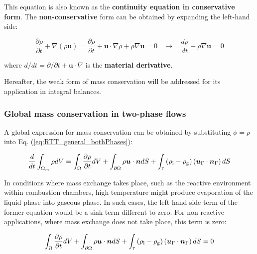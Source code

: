 This equation is also known as the \textbf{continuity equation in conservative form}. The \textbf{non-conservative} form can be obtained by expanding the left-hand side:

\begin{equation}
\frac{\partial \rho}{\partial t} + \nabla \left( \rho \boldsymbol{u} \right) = \frac{\partial \rho}{\partial t} + \boldsymbol{u} \cdot \nabla \rho  + \rho \nabla \boldsymbol{u} = 0 ~~~~ \rightarrow ~~~~ \frac{d \rho}{d t} + \rho \nabla \boldsymbol{u} = 0
\end{equation}

where $d / d t = \partial / \partial t + \boldsymbol{u} \cdot \nabla $ is the \textbf{material derivative}. 

Hereafter, the weak form of mass conservation will be addressed for its application in integral balances.

\subsubsection*{Global mass conservation in two-phase flows}

A global expression for mass conservation can be obtained by substituting $\phi = \rho$ into Eq. (\ref{eq:RTT_general_bothPhases}):

\begin{equation}
\frac{d}{dt} \int_{\Omega_m} \rho dV =   \int_{\Omega}  \frac{\partial \rho}{\partial t}  dV + \int_{\partial \Omega} \rho \boldsymbol{u} \cdot \boldsymbol{n} dS + \int_\mathsmaller{\Gamma} \left( \rho_\mathrm{l} - \rho_\mathrm{g} \right) \left( \boldsymbol{u}_{\scriptsize{\Gamma}} \cdot \boldsymbol{n}_{\scriptsize{\Gamma}} \right) dS
\end{equation}

In conditions where mass exchange takes place, such as the reactive environment within combustion chambers, high temperature might produce evaporation of the liquid phase into gaseous phase. In such cases, the left hand side term of the former equation would be a sink term different to zero. For non-reactive applications, where mass exchange does not take place, this term is zero:

\begin{equation}
\int_{\Omega}  \frac{\partial \rho}{\partial t}  dV + \int_{\partial \Omega} \rho \boldsymbol{u} \cdot \boldsymbol{n} dS + \int_\mathsmaller{\Gamma} \left( \rho_\mathrm{l} - \rho_\mathrm{g} \right) \left( \boldsymbol{u}_{\scriptsize{\Gamma}} \cdot \boldsymbol{n}_{\scriptsize{\Gamma}}\right) dS = 0
\end{equation}

